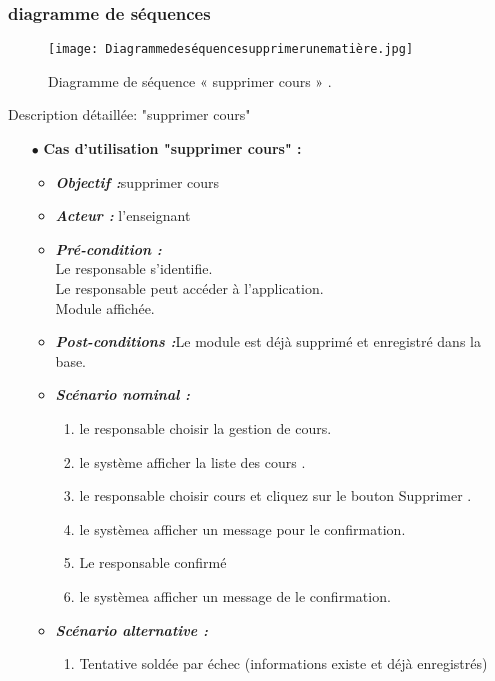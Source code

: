 \clearpage
\subsubsection{diagramme de séquences }
\begin{figure}[ht]
	\centering
	\texttt{[image: Diagrammedeséquencesupprimerunematière.jpg]}
	\caption{ Diagramme de séquence « supprimer cours » .}
	\label{fig: Diagramme de séquence  supprimer cours   }
\end{figure}
\FloatBarrier



{\Large \color{cyan} Description détaillée: "supprimer cours"}
\begin{itemize}
	\item[$\bullet$] \textbf{Cas d’utilisation "supprimer cours" :} 
	\medskip
	\begin{itemize}
		\item \textit{\textbf{Objectif :}}supprimer cours	
		\item \textit{\textbf{Acteur :}}  l'enseignant
		\item \textit{\textbf{Pré-condition  :}} \\
		Le responsable s’identifie.\\
		Le responsable peut accéder à l’application.\\
		Module affichée.
		\item \textit{\textbf{Post-conditions   :}}Le module est déjà supprimé et enregistré dans la
		base.
		\item \textit{\textbf{Scénario nominal :}}
		\begin{enumerate}
			\item le responsable choisir la gestion de cours.
			\item le système afficher la liste des cours .
			\item le responsable choisir cours et cliquez sur le bouton Supprimer .
			
			\item le systèmea afficher un message pour le confirmation. 
			\item  Le responsable confirmé
			\item le systèmea afficher un message de le confirmation.
		\end{enumerate}
		\item \textit{\textbf{Scénario alternative :}}
		\begin{enumerate}
			\item Tentative soldée par échec (informations existe et
			déjà enregistrés)
		\end{enumerate}
	\end{itemize}
\end{itemize}	
\bigskip

